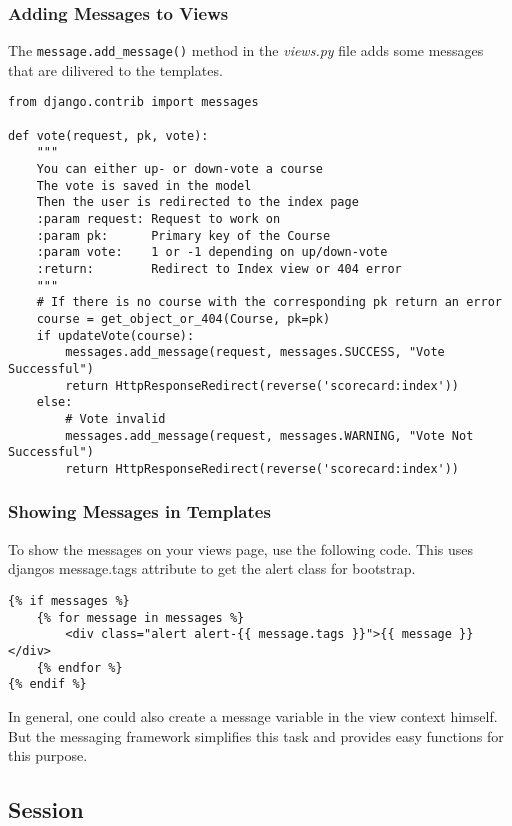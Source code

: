 \subsubsection{Adding Messages to Views}
The \lstinline|message.add_message()| method in the \emph{views.py} file adds some messages that are dilivered to the templates.
\begin{lstlisting}[style=Python, caption=Add messages to views, label=lst:views_msg]
from django.contrib import messages

def vote(request, pk, vote):
    """
    You can either up- or down-vote a course
    The vote is saved in the model
    Then the user is redirected to the index page
    :param request: Request to work on
    :param pk:      Primary key of the Course
    :param vote:    1 or -1 depending on up/down-vote
    :return:        Redirect to Index view or 404 error
    """
    # If there is no course with the corresponding pk return an error
    course = get_object_or_404(Course, pk=pk)
    if updateVote(course):
        messages.add_message(request, messages.SUCCESS, "Vote Successful")
        return HttpResponseRedirect(reverse('scorecard:index'))
    else:
        # Vote invalid
        messages.add_message(request, messages.WARNING, "Vote Not Successful")
        return HttpResponseRedirect(reverse('scorecard:index'))
\end{lstlisting}

\subsubsection{Showing Messages in Templates}
To show the messages on your views page, use the following code. This uses djangos message.tags attribute to get the alert class for bootstrap.
\begin{lstlisting}[style=HTML, caption=index.html, label=lst:index.html1]
{% if messages %}
    {% for message in messages %}
        <div class="alert alert-{{ message.tags }}">{{ message }}</div>
    {% endfor %}
{% endif %}
\end{lstlisting}

In general, one could also create a message variable in the view context himself. But the messaging framework simplifies this task and provides easy functions for this purpose.

\subsection{Session}
\label{ssec:session}


